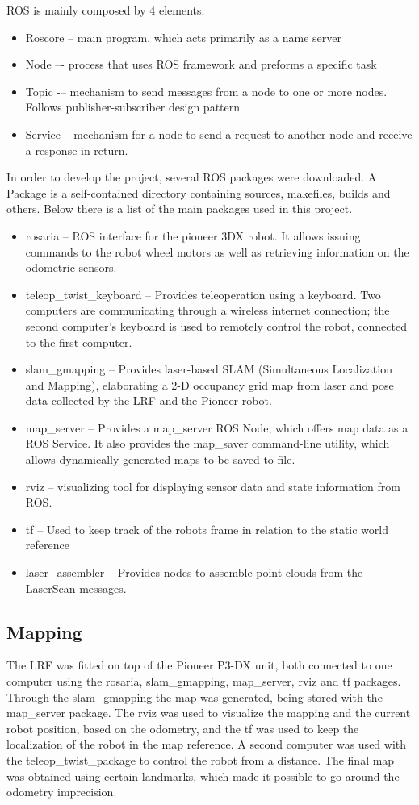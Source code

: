 ROS is mainly composed by 4 elements:
\begin{itemize}
\item Roscore -- main program, which acts primarily as a name server
\item Node –- process that uses ROS framework and preforms a specific task
\item Topic -– mechanism to send messages from a node to one or more nodes. Follows publisher-subscriber design pattern
\item Service -- mechanism for a node to send a request to another node and receive a response in return.
\end{itemize}
In order to develop the project, several ROS packages were downloaded. A Package is a self-contained directory containing sources, makefiles, builds and others. Below there is a list of the main packages used in this project.
\begin{itemize}
\item rosaria -- ROS interface for the pioneer 3DX robot. It allows issuing commands to the robot wheel motors as well as retrieving information on the odometric sensors.
\item teleop\_twist\_keyboard -- Provides teleoperation using a keyboard. Two computers are communicating through a wireless internet connection; the second computer’s keyboard is used to remotely control the robot, connected to the first computer. 
\item slam\_gmapping -- Provides laser-based SLAM (Simultaneous Localization and Mapping), elaborating a 2-D occupancy grid map from laser and pose data collected by the LRF and the Pioneer robot.
\item map\_server -- Provides a map\_server ROS Node, which offers map data as a ROS Service. It also provides the map\_saver command-line utility, which allows dynamically generated maps to be saved to file.
\item rviz -- visualizing tool for displaying sensor data and state information from ROS.
\item tf -- Used to keep track of the robots frame in relation to the static world reference
\item laser\_assembler -- Provides nodes to assemble point clouds from the LaserScan messages.
\end{itemize}


\subsection{Mapping}
\label{subsec:mapping}
The LRF was fitted on top of the Pioneer P3-DX unit, both connected to one computer using the rosaria, slam\_gmapping, map\_server, rviz and tf packages. Through the slam\_gmapping the map was generated, being stored with the map\_server package. The rviz was used to visualize the mapping and the current robot position, based on the odometry, and the tf was used to keep the localization of the robot in the map reference. A second computer was used with the teleop\_twist\_package to control the robot from a distance. The final map was obtained using certain landmarks, which made it possible to go around the odometry imprecision.

